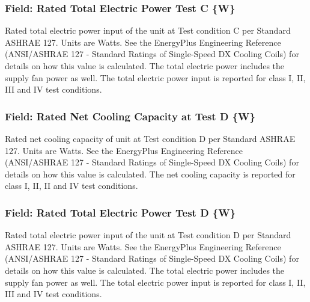 \subsubsection{Field: Rated Total Electric Power Test C \{W\}}\label{field-rated-total-electric-power-test-c-w}

Rated total electric power input of the unit at Test condition C per Standard ASHRAE 127. Units are Watts. See the EnergyPlus Engineering Reference (ANSI/ASHRAE 127 - Standard Ratings of Single-Speed DX Cooling Coils) for details on how this value is calculated. The total electric power includes the supply fan power as well. The total electric power input is reported for class I, II, III and IV test conditions.

\subsubsection{Field: Rated Net Cooling Capacity at Test D \{W\}}\label{field-rated-net-cooling-capacity-at-test-d-w}

Rated net cooling capacity of unit at Test condition D per Standard ASHRAE 127. Units are Watts. See the EnergyPlus Engineering Reference (ANSI/ASHRAE 127 - Standard Ratings of Single-Speed DX Cooling Coils) for details on how this value is calculated. The net cooling capacity is reported for class I, II, II and IV test conditions.

\subsubsection{Field: Rated Total Electric Power Test D \{W\}}\label{field-rated-total-electric-power-test-d-w}

Rated total electric power input of the unit at Test condition D per Standard ASHRAE 127. Units are Watts. See the EnergyPlus Engineering Reference (ANSI/ASHRAE 127 - Standard Ratings of Single-Speed DX Cooling Coils) for details on how this value is calculated. The total electric power includes the supply fan power as well. The total electric power input is reported for class I, II, III and IV test conditions.

